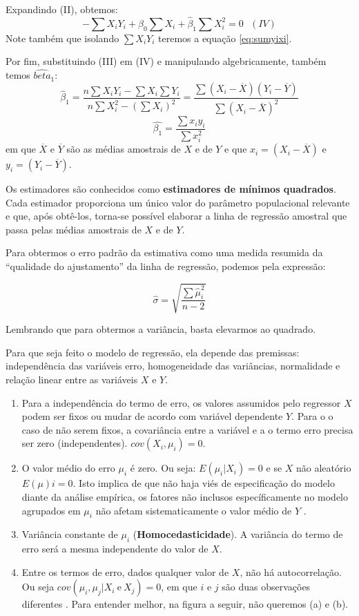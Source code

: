 \documentclass[
]{book}
\begin{document}
Expandindo (II), obtemos:
\[-\sum X_iY_i+\hat{\beta}_0\sum X_i+\hat{\beta}_1\sum X_i^2=0 \ \ \ (IV)\]
Note também que isolando \(\sum X_i Y_i\) teremos a equação \eqref{eq:sumyixi}.

Por fim, substituindo (III) em (IV) e manipulando algebricamente, também temos \(\hat{beta}_1\):
\[\hat{\beta}_1=\frac{n\sum X_iY_i-\sum X_i \sum Y_i}{n\sum X_i^2-(\sum X_i)^2}=\frac{\sum (X_i-\overline{X})(Y_i-\overline{Y})}{\sum(X_i-\overline{X})^2}\]
\begin{equation}
\hat{\beta_1}=\frac{\sum x_i y_i}{\sum x_i^2}
\label{eq:betaum}
\end{equation}
em que \(\overline{X}\) e \(\overline{Y}\) são as médias amostrais de \(X\) e de \(Y\) e que \(x_i=(X_i-\overline{X})\) e \(y_i=(Y_i-\overline{Y})\).

Os estimadores são conhecidos como \textbf{estimadores de mínimos quadrados}. Cada estimador proporciona um único valor do parâmetro populacional relevante e que, após obtê-los, torna-se possível elaborar a linha de regressão amostral que passa pelas médias amostrais de \(X\) e de \(Y\).

Para obtermos o erro padrão da estimativa como uma medida resumida da ``qualidade do ajustamento'' da linha de regressão, podemos pela expressão:

\begin{equation}
\hat{\sigma}=\sqrt{\frac{\sum \hat{\mu}_i^2}{n-2}}
\label{eq:desvioreg}
\end{equation}

Lembrando que para obtermos a variância, basta elevarmos ao quadrado.

Para que seja feito o modelo de regressão, ela depende das premissas: independência das variáveis erro, homogeneidade das variâncias, normalidade e relação linear entre as variáveis \(X\) e \(Y\).

\begin{enumerate}
\def\labelenumi{\arabic{enumi}.}
\item
  Para a independência do termo de erro, os valores assumidos pelo regressor \(X\) podem ser fixos ou mudar de acordo com variável dependente \(Y\). Para o o caso de não serem fixos, a covariância entre a variável e a o termo erro precisa ser zero (independentes). \(cov(X_i,\mu_i)=0\).
\item
  O valor médio do erro \(\mu_i\) é zero. Ou seja: \(E(\mu_i|X_i)=0\) e se \(X\) não aleatório \(E(\mu)i=0\). Isto implica de que não haja viés de especificação do modelo diante da análise empírica, os fatores não inclusos específicamente no modelo agrupados em \(\mu_i\) não afetam sistematicamente o valor médio de \(Y\) \citep{gujarati2011econometria}.
\item
  Variância constante de \(\mu_i\) (\textbf{Homocedasticidade}). A variância do termo de erro será a mesma independente do valor de \(X\).
\item
  Entre os termos de erro, dados qualquer valor de \(X\), não há autocorrelação. Ou seja \(cov(\mu_i,\mu_j|X_i \ \mbox{e} \ X_j)=0\), em que \(i\) e \(j\) são duas observações diferentes \citep{gujarati2011econometria}. Para entender melhor, na figura a seguir, não queremos (a) e (b).
\end{enumerate}
\end{document}
